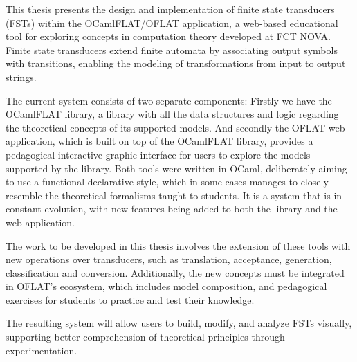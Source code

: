 
%

This thesis presents the design and implementation of finite state transducers (FSTs) within the OCamlFLAT/OFLAT application, 
a web-based educational tool for exploring concepts in computation theory developed at FCT NOVA. 
Finite state transducers extend finite automata by associating output symbols with transitions, 
enabling the modeling of transformations from input to output strings. 

The current system consists of two separate components:
Firstly we have the OCamlFLAT library, a library with all the data structures and logic regarding the theoretical concepts of its supported models.
And secondly the OFLAT web application, which is built on top of the OCamlFLAT library, provides a pedagogical interactive graphic interface 
for users to explore the models supported by the library.
Both tools were written in OCaml, deliberately aiming to use a functional declarative style, 
which in some cases manages to closely resemble the theoretical formalisms taught to students.
It is a system that is in constant evolution, with new features being added to both the library and the web application.

The work to be developed in this thesis involves the extension of these tools with new operations over transducers, 
such as translation, acceptance, generation, classification and conversion.
Additionally, the new concepts must be integrated in OFLAT's ecosystem, which includes model composition,
and pedagogical exercises for students to practice and test their knowledge.

The resulting system will allow users to build, modify, and analyze FSTs visually, 
supporting better comprehension of theoretical principles through experimentation.
